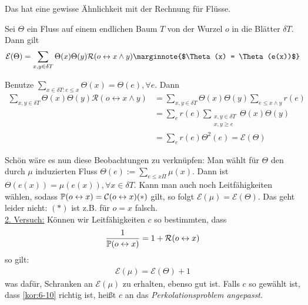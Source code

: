 Das hat eine gewisse Ähnlichkeit mit der Rechnung für Flüsse.
\begin{lemma}
	Sei $\Theta$ ein Fluss auf einem endlichen Baum $T$ von der Wurzel $o$ in die Blätter $\delta T$. Dann gilt
	\begin{align}
		\mathcal{E}(\Theta) = \sum\limits_{x,y \in \delta T}\Theta(x) \Theta(y) \mathcal{R}(o \leftrightarrow x\land y) \marginnote{$\Theta(x) = \Theta(e(x))$}
	\end{align}
\end{lemma}
\begin{beweis}
	Benutze $\sum\limits_{x \in \delta T: e \leq x} \Theta(x) = \Theta(e), \forall e$. Dann
	\begin{align}
		\sum\limits_{x,y \in \delta T} \Theta(x) \Theta(y) \mathcal{R}(o \leftrightarrow x \land y) &= \sum\limits_{x,y \in \delta T} \Theta(x) \Theta(y) \sum\limits_{e \leq x\land y} r(e) \\
			&= \sum\limits_{e} r(e) \sum\limits_{\substack{x,y \in \delta T \\ x,y \geq e}} \Theta(x) \Theta(y)\\
			&= \sum\limits_{e} r(e) \Theta^2(e) = \mathcal{E}(\Theta)
	\end{align}
\end{beweis}
Schön wäre es nun diese Beobachtungen zu verknüpfen: Man wählt für $\Theta$ den durch $\mu$ induzierten Fluss $\Theta(e):= \sum\limits_{e \leq x \overline{\Pi}}\mu(x).$ Dann ist $\Theta(e(x)) = \mu(e(x)), \forall x \in \delta T$. Kann man auch noch Leitfähigkeiten wählen, sodass $\prop{o \leftrightarrow x}  = \mathcal{C}(o \leftrightarrow x) (*)$ gilt, so folgt $\mathcal{E}(\mu) = \mathcal{E}(\Theta)$. Das geht leider nicht: $(*)$ ist z.B. für $o = x$ falsch. \\
\underline{2. Versuch:} Können wir Leitfähigkeiten $c$ so bestimmten, dass 
\begin{align}
	\frac{1}{\prop{o \leftrightarrow x}} = 1+\mathcal{R}(o \leftrightarrow x) 
\end{align}
so gilt:
\begin{align}
	\mathcal{E}(\mu) = \mathcal{E}(\Theta) + 1 
\end{align}
was dafür, Schranken an $\mathcal{E}(\mu)$ zu erhalten, ebenso gut ist. Falls $c$ so gewählt ist, dass \autoref{kor:6-10} richtig ist, heißt $c$ an das \emph{Perkolationsproblem angepasst}. 

